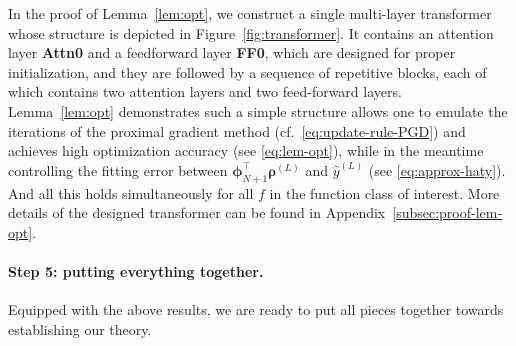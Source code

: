 \documentclass[english]{article}
\begin{document}
%
In the proof of Lemma~\ref{lem:opt}, we construct a single multi-layer transformer whose structure is depicted in Figure~\ref{fig:transformer}.
It contains an attention layer \textbf{Attn0} and a feedforward layer \textbf{FF0}, which are designed for proper initialization, and they are followed by a sequence of repetitive blocks, each of which contains two attention layers and two feed-forward layers. 
Lemma~\ref{lem:opt} demonstrates such a simple structure allows one to emulate the iterations of the proximal gradient method (cf.~\eqref{eq:update-rule-PGD}) and achieves high optimization accuracy (see \eqref{eq:lem-opt}), while in the meantime controlling the fitting error between ${\bm \phi}_{N+1}^{\top}{\bm \rho}^{(L)}$ and $ \widehat{y}^{(L)}$ (see \eqref{eq:approx-haty}). And all this holds simultaneously for all $f$ in the function class of interest. 
More details of the designed transformer can be found in  
Appendix~\ref{subsec:proof-lem-opt}.





\paragraph{Step 5: putting everything together.} 
%
Equipped with the above results, we are ready to put all pieces together towards establishing our theory. 
\end{document}
